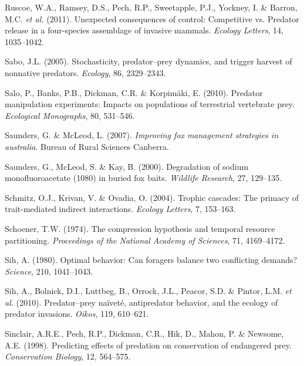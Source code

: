 \documentclass[11pt,a4paper,titlepage,twoside,openright]{style/unimelbthesis}
\begin{document}
\begin{mainmatter}
\leavevmode\hypertarget{ref-ruscoe2011unexpected}{}%
Ruscoe, W.A., Ramsey, D.S., Pech, R.P., Sweetapple, P.J., Yockney, I. \& Barron, M.C. \emph{et al.} (2011). Unexpected consequences of control: Competitive vs. Predator release in a four-species assemblage of invasive mammals. \emph{Ecology Letters}, 14, 1035--1042.

\leavevmode\hypertarget{ref-sabo2005stochasticity}{}%
Sabo, J.L. (2005). Stochasticity, predator--prey dynamics, and trigger harvest of nonnative predators. \emph{Ecology}, 86, 2329--2343.

\leavevmode\hypertarget{ref-salo2010predator}{}%
Salo, P., Banks, P.B., Dickman, C.R. \& Korpimäki, E. (2010). Predator manipulation experiments: Impacts on populations of terrestrial vertebrate prey. \emph{Ecological Monographs}, 80, 531--546.

\leavevmode\hypertarget{ref-saunders2007improving}{}%
Saunders, G. \& McLeod, L. (2007). \emph{Improving fox management strategies in australia}. Bureau of Rural Sciences Canberra.

\leavevmode\hypertarget{ref-saunders2000degradation}{}%
Saunders, G., McLeod, S. \& Kay, B. (2000). Degradation of sodium monofluoroacetate (1080) in buried fox baits. \emph{Wildlife Research}, 27, 129--135.

\leavevmode\hypertarget{ref-schmitz2004trophic}{}%
Schmitz, O.J., Krivan, V. \& Ovadia, O. (2004). Trophic cascades: The primacy of trait-mediated indirect interactions. \emph{Ecology Letters}, 7, 153--163.

\leavevmode\hypertarget{ref-schoener1974compression}{}%
Schoener, T.W. (1974). The compression hypothesis and temporal resource partitioning. \emph{Proceedings of the National Academy of Sciences}, 71, 4169--4172.

\leavevmode\hypertarget{ref-sih1980optimal}{}%
Sih, A. (1980). Optimal behavior: Can foragers balance two conflicting demands? \emph{Science}, 210, 1041--1043.

\leavevmode\hypertarget{ref-sih2010predator}{}%
Sih, A., Bolnick, D.I., Luttbeg, B., Orrock, J.L., Peacor, S.D. \& Pintor, L.M. \emph{et al.} (2010). Predator--prey naïveté, antipredator behavior, and the ecology of predator invasions. \emph{Oikos}, 119, 610--621.

\leavevmode\hypertarget{ref-sinclair1998predicting}{}%
Sinclair, A.R.E., Pech, R.P., Dickman, C.R., Hik, D., Mahon, P. \& Newsome, A.E. (1998). Predicting effects of predation on conservation of endangered prey. \emph{Conservation Biology}, 12, 564--575.


\end{mainmatter}
\end{document}
